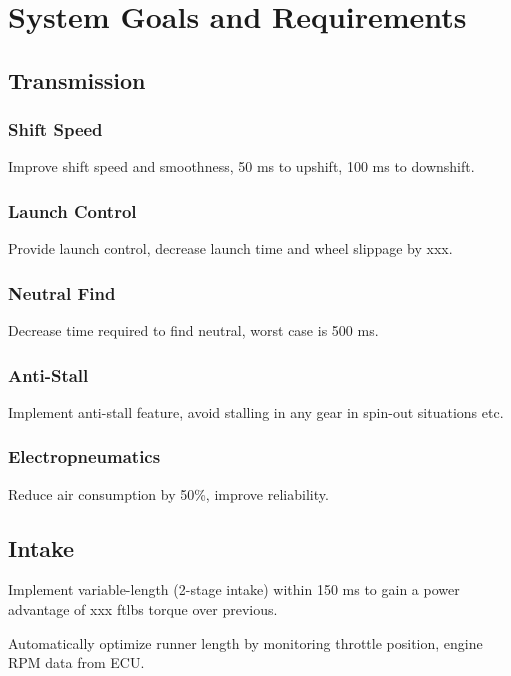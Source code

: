 \chapter{System Goals and Requirements}


\section{Transmission}


\subsection{Shift Speed}

Improve shift speed and smoothness, 50 ms to upshift, 100 ms to downshift.


\subsection{Launch Control}

Provide launch control, decrease launch time and wheel slippage by
xxx.


\subsection{Neutral Find}

Decrease time required to find neutral, worst case is 500 ms.


\subsection{Anti-Stall}

Implement anti-stall feature, avoid stalling in any gear in spin-out
situations etc.


\subsection{Electropneumatics}

Reduce air consumption by 50\%, improve reliability. 


\section{Intake}

Implement variable-length (2-stage intake) within 150 ms to gain a
power advantage of xxx ftlbs torque over previous.

Automatically optimize runner length by monitoring throttle position,
engine RPM data from ECU.


